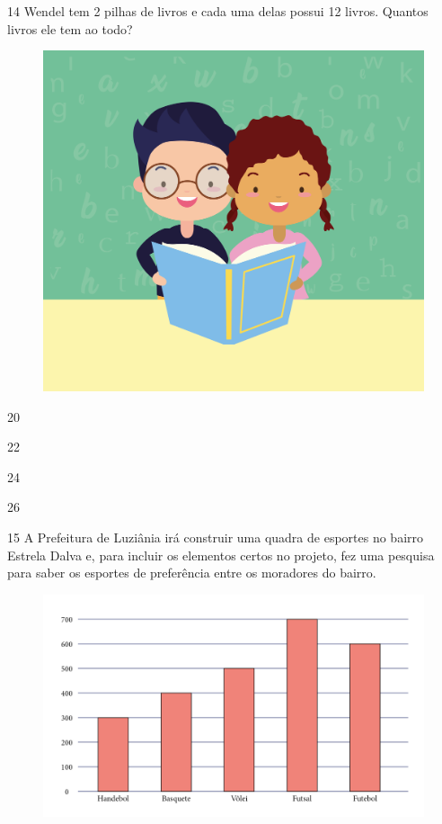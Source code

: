 \num{14} Wendel tem 2 pilhas de livros e cada uma delas possui 12 livros. Quantos livros ele tem ao todo?

\begin{figure}[H]
\centering
\includegraphics[width=.5\textwidth]{./media/image177.jpg}
\end{figure}

\begin{escolha}[itemsep=-5pt]
\begin{multicols}{2}
\item 20

\item 22

\item 24

\item 26
\end{multicols}
\end{escolha}

\num{15} A Prefeitura de Luziânia irá construir uma quadra de esportes no bairro
Estrela Dalva e, para incluir os elementos certos no projeto, fez uma
pesquisa para saber os esportes de preferência entre os moradores
do bairro.

\begin{figure}[H]
\centering
\includegraphics[width=.9\textwidth]{./media/image122.png}
\end{figure}

